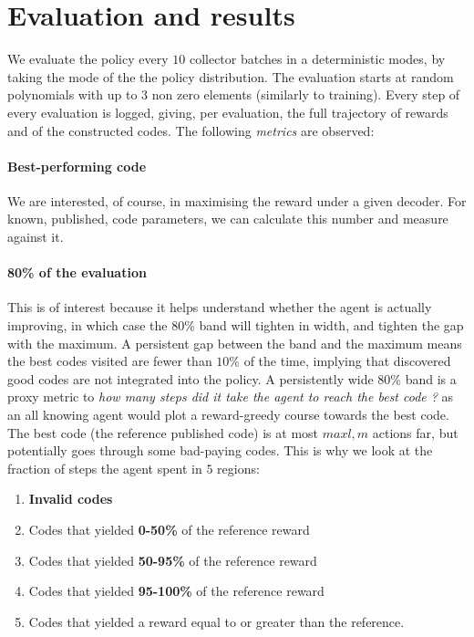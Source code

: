 \section{Evaluation and results}\label{sec:evaluation}
We evaluate the policy every \(10\) collector batches in a deterministic modes, by taking the mode of the the policy distribution. 
The evaluation starts at random polynomials with up to \(3\) non zero elements (similarly to training). 
Every step of every evaluation is logged, giving, per evaluation, the full trajectory of rewards and of the constructed codes. 
The following \emph{metrics} are observed:
\paragraph{Best-performing code} We are interested, of course, in maximising the reward under a given decoder. For known, published, code parameters, we can calculate this number and measure against it.
\paragraph{80\% of the evaluation} This is of interest because it helps understand whether the agent is actually improving, in which case the 80\% band will tighten in width, and tighten the gap with the maximum. 
A persistent gap between the band and the maximum means the best
codes visited are fewer than $10\%$ of the time, implying that discovered good codes are not integrated into the policy. 
A persistently wide 80\% band is a proxy metric to 
\textit{how many steps did it take the agent to reach the best code ?} 
as an all knowing agent would plot a reward-greedy course towards the best code. The best code (the reference published code) is at most \(max{l,m}\) actions far, 
but potentially goes through some bad-paying codes. This is why we look at the fraction of steps the agent spent in \(5\) regions:
\begin{enumerate}[label = \roman*]
        \label{list:regions}
\item \textbf{Invalid codes}
\item Codes that yielded \textbf{0-50\%} of the reference reward
\item Codes that yielded \textbf{50-95\%} of the reference reward
\item Codes that yielded \textbf{95-100\%} of the reference reward
\item Codes that yielded a reward equal to or greater than the reference.
\end{enumerate}

